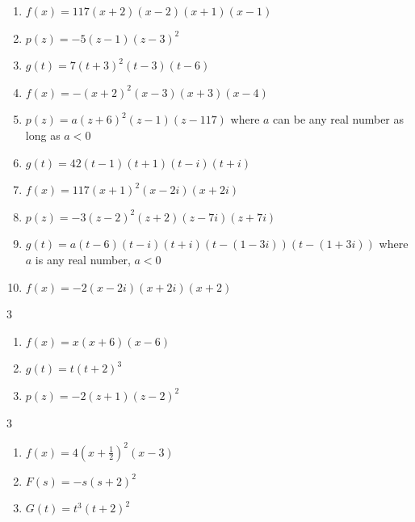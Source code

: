 \documentclass{ximera}
\begin{document}
\begin{enumerate}
\setcounter{enumi}{\value{HW}}

\item $f(x) = 117(x+2)(x-2)(x+1)(x-1)$

\item $p(z)= -5(z-1)(z-3)^2$

\item  $g(t) = 7(t+3)^2(t-3)(t-6)$

\item $f(x) = -(x + 2)^{2}(x - 3)(x + 3)(x - 4)$

\item $p(z) = a(z+6)^2(z-1)(z-117)$ where $a$ can be any real number as long as $a<0$


\item $g(t) = 42(t-1)(t+1)(t-i)(t+i)$

\item $f(x) = 117(x+1)^2(x-2i)(x+2i)$

\item  $p(z) = -3(z-2)^2(z+2)(z-7i)(z+7i)$

\item $g(t) = a(t-6)(t-i)(t+i)(t-(1-3i))(t-(1+3i))$ where $a$ is any real number,  $a < 0$

\item $f(x) = -2(x-2i)(x+2i)(x+2)$

\setcounter{HW}{\value{enumi}}
\end{enumerate}

\begin{multicols}{3}
\begin{enumerate}
\setcounter{enumi}{\value{HW}}

\item $f(x) = x(x+6)(x-6)$

\item $g(t) = t(t+2)^3$

\item $p(z) = -2(z+1)(z-2)^2$

\setcounter{HW}{\value{enumi}}
\end{enumerate}
\end{multicols}


\begin{multicols}{3}
\begin{enumerate}
\setcounter{enumi}{\value{HW}}


\item $f(x) = 4\left(x+ \frac{1}{2}\right)^2 (x-3)$

\item $F(s)  =-s(s+2)^2$

\item $G(t) = t^3(t+2)^2$

\setcounter{HW}{\value{enumi}}
\end{enumerate}
\end{multicols}
\end{document}
